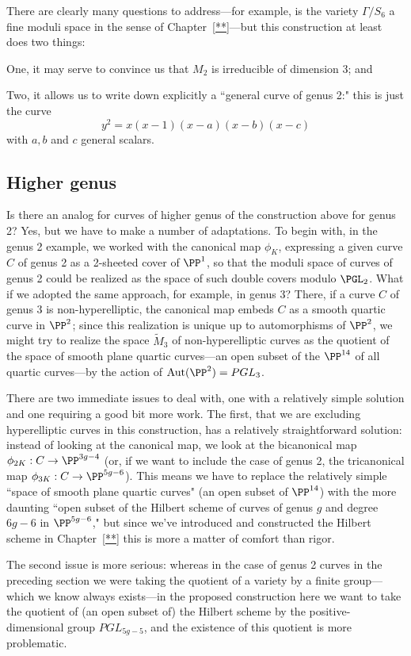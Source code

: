 There are clearly many questions to address---for example, is the variety $\Gamma/S_6$ a fine moduli space in the sense of Chapter~\ref{**}---but this construction at least does two things:

One, it may serve to convince us that $M_2$ is irreducible of dimension 3; and

Two, it allows us to write down explicitly a ``general curve of genus 2:" this is just the curve
$$
y^2 = x(x-1)(x-a)(x-b)(x-c)
$$
with $a, b$ and $c$ general scalars.

\subsection{Higher genus}

Is there an analog for curves of higher genus of the construction above for genus 2? Yes, but we have to make a number of adaptations. To begin with, in the genus 2 example, we worked with the canonical map $\phi_K$, expressing a given curve $C$ of genus 2 as a 2-sheeted cover of $\PP^1$, so that the moduli space of curves of genus 2 could be realized as the space of such double covers modulo $\PGL_2$. What if we adopted the same approach, for example, in genus 3? There, if a curve $C$ of genus 3 is non-hyperelliptic, the canonical map embeds $C$ as a smooth quartic curve in $\PP^2$; since this realization is unique up to automorphisms of $\PP^2$, we might try to realize the space $\tilde M_3$ of non-hyperelliptic curves as the quotient of the space of smooth plane quartic curves---an open subset of the $\PP^{14}$ of all quartic curves---by the action of ${\rm Aut}(\PP^2) = PGL_3$.

There are two immediate issues to deal with, one with a relatively simple solution and one requiring a good bit more work. The first, that we are excluding hyperelliptic curves in this construction, has a relatively straightforward solution: instead of looking at the canonical map, we look at the bicanonical map $\phi_{2K} : C \to \PP^{3g-4}$ (or, if we want to include the case of genus 2, the tricanonical map  $\phi_{3K} : C \to \PP^{5g-6}$). This means we have to replace the relatively simple ``space of smooth plane quartic curves" (an open subset of $\PP^{14}$) with the more daunting ``open subset of the Hilbert scheme of curves of genus $g$ and degree $6g-6$ in $\PP^{5g-6}$," but since we've introduced and constructed the Hilbert scheme in Chapter~\ref{**} this is more a matter of comfort than rigor.

The second issue is more serious: whereas in the case of genus 2 curves in the preceding section we were taking the quotient of a variety by a finite group---which we know always exists---in the proposed construction here we want to take the quotient of (an open subset of) the Hilbert scheme by the positive-dimensional group $PGL_{5g-5}$, and the existence of this quotient is more problematic.

